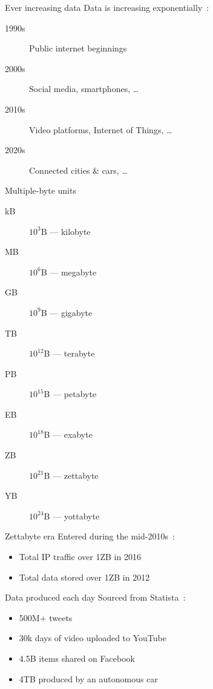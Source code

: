 \begin{frame}{Ever increasing data}
  Data is increasing exponentially~:
  \begin{description}
    \item[1990s] Public internet beginnings
    \item[2000s] Social media, smartphones, …
    \item[2010s] Video platforms, Internet of Things, …
    \item[2020s] Connected cities \& cars, …
  \end{description}
\end{frame}

\begin{frame}{Multiple-byte units}
  \begin{description}
    \item[kB] $10^3$B — kilobyte
    \item[MB] $10^6$B — megabyte
    \item[GB] $10^9$B — gigabyte
    \item[TB] $10^{12}$B — terabyte
    \item[PB] $10^{15}$B — petabyte
    \item[EB] $10^{18}$B — exabyte
    \item[ZB] $10^{21}$B — zettabyte
    \item[YB] $10^{24}$B — yottabyte
  \end{description}
\end{frame}

\begin{frame}{Zettabyte era}
  Entered during the mid-2010s~:
  \begin{itemize}
    \item Total IP traffic over 1ZB in 2016
    \item Total data stored over 1ZB in 2012
  \end{itemize}
\end{frame}

\begin{frame}{Data produced each day}
  Sourced from Statista~:
  \begin{itemize}
    \item 500M+ tweets
    \item 30k days of video uploaded to YouTube
    \item 4.5B items shared on Facebook
    \item 4TB produced by an autonomous car
  \end{itemize}
\end{frame}

